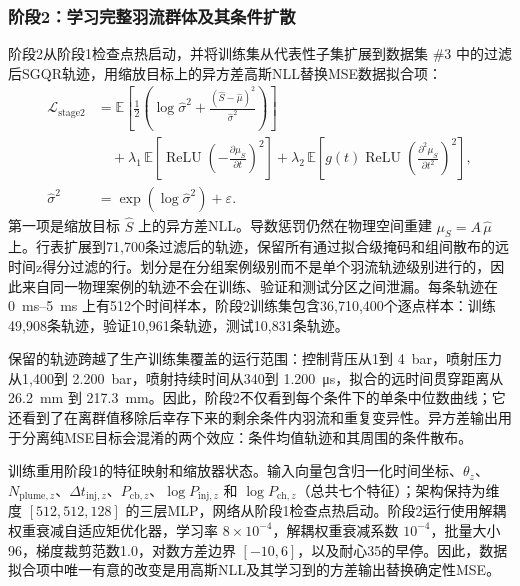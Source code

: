 \subsubsection{阶段2：学习完整羽流群体及其条件扩散}

阶段2从阶段1检查点热启动，并将训练集从代表性子集扩展到数据集 \#3 中的过滤后SGQR轨迹，用缩放目标上的异方差高斯NLL替换MSE数据拟合项：
\[
\begin{aligned}
\mathcal{L}_{\mathrm{stage2}}
&=
\mathbb{E}\!\left[
\frac{1}{2}
\left(
\log \hat{\sigma}^{2}
+\frac{(\hat{S}-\hat{\mu})^{2}}{\hat{\sigma}^{2}}
\right)\right]
\\
&\quad
+\lambda_{1}\,
\mathbb{E}\!\left[
\operatorname{ReLU}\!\left(-\frac{\partial \mu_S}{\partial t}\right)^{2}
\right]
+\lambda_{2}\,
\mathbb{E}\!\left[
g(t)\operatorname{ReLU}\!\left(\frac{\partial^{2}\mu_S}{\partial t^{2}}\right)^{2}
\right],
\\
\hat{\sigma}^{2}
&=\exp(\log\hat{\sigma}^{2})+\varepsilon.
\end{aligned}
\]
第一项是缩放目标 $\hat{S}$ 上的异方差NLL。导数惩罚仍然在物理空间重建 $\mu_S=A\,\hat{\mu}$ 上。行表扩展到71,700条过滤后的轨迹，保留所有通过拟合级掩码和组间散布的远时间z得分过滤的行。划分是在分组案例级别而不是单个羽流轨迹级别进行的，因此来自同一物理案例的轨迹不会在训练、验证和测试分区之间泄漏。每条轨迹在 \SIrange{0}{5}{ms} 上有512个时间样本，阶段2训练集包含36,710,400个逐点样本：训练49,908条轨迹，验证10,961条轨迹，测试10,831条轨迹。

保留的轨迹跨越了生产训练集覆盖的运行范围：控制背压从1到 \SI{4}{bar}，喷射压力从1,400到 \SI{2,200}{bar}，喷射持续时间从340到 \SI{1,200}{\micro s}，拟合的远时间贯穿距离从 \SI{26.2}{mm} 到 \SI{217.3}{mm}。因此，阶段2不仅看到每个条件下的单条中位数曲线；它还看到了在离群值移除后幸存下来的剩余条件内羽流和重复变异性。异方差输出用于分离纯MSE目标会混淆的两个效应：条件均值轨迹和其周围的条件散布。

训练重用阶段1的特征映射和缩放器状态。输入向量包含归一化时间坐标、\(\theta_z\)、\(N_{\mathrm{plume},z}\)、\(\Delta t_{\mathrm{inj},z}\)、\(P_{\mathrm{cb},z}\)、\(\log P_{\mathrm{inj},z}\) 和 \(\log P_{\mathrm{ch},z}\)（总共七个特征）；架构保持为维度 $[512,512,128]$ 的三层MLP，网络从阶段1检查点热启动。阶段2运行使用解耦权重衰减自适应矩优化器，学习率 \(8\times10^{-4}\)，解耦权重衰减系数 \(10^{-4}\)，批量大小96，梯度裁剪范数1.0，对数方差边界 \([-10,6]\)，以及耐心35的早停。因此，数据拟合项中唯一有意的改变是用高斯NLL及其学习到的方差输出替换确定性MSE。

